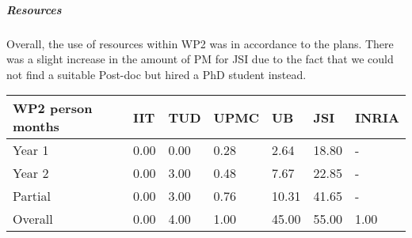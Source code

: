 \subparagraph{Resources}
Overall, the use of resources within WP2 was in accordance to the plans. There was a slight increase in the amount of PM for JSI due to the fact that we could not find a suitable Post-doc but hired a PhD student instead.

\begin{center}
\begin{tabular}{|C{1.5cm}|C{1.5cm}|C{1.5cm}|C{2cm}|C{2cm}|C{2cm}|C{2cm}|}
\hline
\footnotesize \textbf{WP2 person months}& \footnotesize \textbf{IIT}&\footnotesize \textbf{TUD}&\footnotesize \textbf{UPMC}& \footnotesize \textbf{UB} &\footnotesize \textbf{JSI} & \footnotesize \textbf{INRIA} \\ \hline
\footnotesize Year 1 &  0.00     & 0.00 & 0.28 & 2.64 & 18.80  &-  \\  \hline
\footnotesize Year 2 &  0.00     & 3.00 & 0.48 & 7.67 & 22.85  &-  \\  \hline
\footnotesize Partial &  0.00     & 3.00 & 0.76 & 10.31 & 41.65 & - \\ \hline \hline
\footnotesize Overall & 0.00     & 4.00 & 1.00 & 45.00 & 55.00 & 1.00 \\ \hline
\end{tabular}
\end{center}

